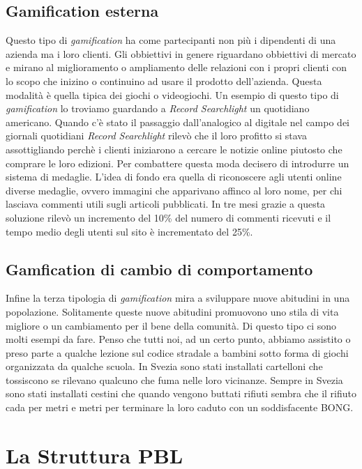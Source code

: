 \subsection{Gamification esterna}
Questo tipo di \textit{gamification} ha come partecipanti non più i dipendenti di una azienda ma i loro clienti. Gli obbiettivi in genere riguardano obbiettivi di mercato e mirano al miglioramento o ampliamento delle relazioni con i propri clienti con lo scopo che inizino o continuino ad usare il prodotto dell'azienda. Questa modalità è quella tipica dei giochi o videogiochi. Un esempio di questo tipo di \textit{gamification} lo troviamo guardando a \textit{Record Searchlight} un quotidiano americano. Quando c'è stato il passaggio dall'analogico al digitale nel campo dei giornali quotidiani \textit{Record Searchlight} rilevò che il loro profitto si stava assottigliando perchè i clienti iniziarono a cercare le notizie online piutosto che comprare le loro edizioni. Per combattere questa moda decisero di introdurre un sistema di medaglie. L'idea di fondo era quella di riconoscere agli utenti online diverse medaglie, ovvero immagini che apparivano affinco al loro nome, per chi lasciava commenti utili sugli articoli pubblicati. In tre mesi grazie a questa soluzione rilevò un incremento del 10\% del numero di commenti ricevuti e il tempo medio degli utenti sul sito è incrementato del 25\%.
\subsection{Gamfication di cambio di comportamento}
Infine la terza tipologia di \textit{gamification} mira a sviluppare nuove abitudini in una popolazione. Solitamente queste nuove abitudini promuovono uno stila di vita migliore o un cambiamento per il bene della comunità. Di questo tipo ci sono molti esempi da fare. Penso che tutti noi, ad un certo punto, abbiamo assistito o preso parte a qualche lezione sul codice stradale a bambini sotto forma di giochi organizzata da qualche scuola. In Svezia sono stati installati cartelloni che tossiscono se rilevano qualcuno che fuma nelle loro vicinanze. Sempre in Svezia sono stati installati cestini che quando vengono buttati rifiuti sembra che il rifiuto cada per metri e metri per terminare la loro caduto con un soddisfacente BONG.
\section{La Struttura PBL}

